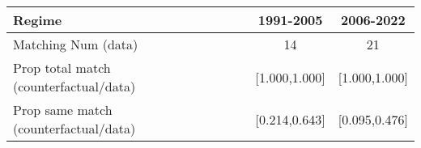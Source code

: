 
\begin{tabular}[t]{lccc}
\toprule
Regime &  & 1991-2005 & 2006-2022\\
\midrule
Matching Num (data) &  & 14 & 21\\
Prop total match (counterfactual/data) &  & {}[1.000,1.000] & {}[1.000,1.000]\\
Prop same match (counterfactual/data) &  & {}[0.214,0.643] & {}[0.095,0.476]\\
\bottomrule
\end{tabular}
